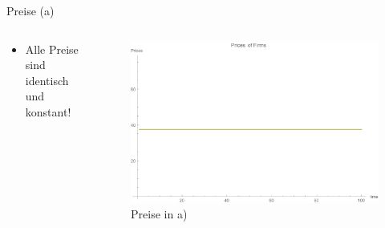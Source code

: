 \documentclass[xcolor={dvipsnames},10pt]{beamer}
\begin{document}
\begin{frame}{Preise (a)}
\begin{columns}[T]
    \begin{column}{.3\textwidth}
      \begin{itemize}
      \item Alle Preise sind identisch und konstant!
      \end{itemize}
      \end{column}
      \begin{column}{.7\textwidth}
      \begin{figure}[t]
            \centering
            \includegraphics[scale=0.35]{../Plots/prices1a}
            \caption{Preise in a)}
            \label{fig:prices1a}
       \end{figure}
    \end{column}
  \end{columns}
\end{frame}
\end{document}
